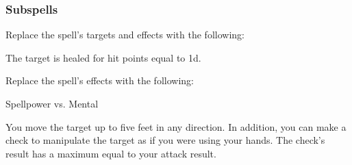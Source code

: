 \subsubsection{Subspells}





Replace the spell's targets and effects with the following:
\begin{spellcontent}

\begin{augmenttargetinginfo}




\end{augmenttargetinginfo}


\begin{augmenteffects}



\spelleffect
The target is healed for hit points equal to  \plus1d.






\end{augmenteffects}

\end{spellcontent}








Replace the spell's effects with the following:
\begin{spellcontent}

\begin{augmenteffects}




\begin{spellattack}{Spellpower vs. Mental}


\spellsuccess
You move the target up to five feet in any direction.
In addition, you can make a check to manipulate the target as if you were using your hands.
The check's result has a maximum equal to your attack result.



\end{spellattack}





\end{augmenteffects}

\end{spellcontent}





